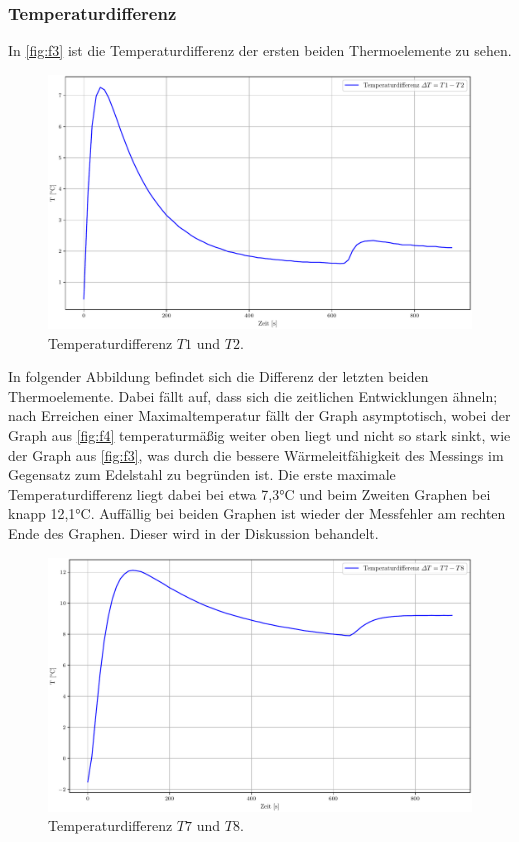 \subsubsection{Temperaturdifferenz}
In \autoref{fig:f3} ist die Temperaturdifferenz der ersten beiden Thermoelemente 
zu sehen.
\begin{figure}[H]
  \centering
  \includegraphics[width=\textwidth]{plotdiff12.pdf}
  \caption{Temperaturdifferenz $T1$ und $T2$.}
  \label{fig:f3}
\end{figure}
In folgender Abbildung befindet sich die Differenz der letzten beiden Thermoelemente.
Dabei fällt auf, dass sich die zeitlichen Entwicklungen ähneln; nach Erreichen 
einer Maximaltemperatur fällt der Graph asymptotisch, wobei der Graph aus 
\autoref{fig:f4} temperaturmäßig weiter oben liegt und nicht so stark sinkt, wie 
der Graph aus \autoref{fig:f3}, was durch die bessere Wärmeleitfähigkeit des Messings 
im Gegensatz zum Edelstahl zu begründen ist. Die erste maximale
Temperaturdifferenz liegt dabei bei etwa 7,3°C und beim Zweiten Graphen bei 
knapp 12,1°C. Auffällig bei beiden Graphen ist wieder der Messfehler am rechten
Ende des Graphen. Dieser wird in der Diskussion behandelt. 
\begin{figure}[H]
  \centering
  \includegraphics[width=\textwidth]{plotdiff78.pdf}
  \caption{Temperaturdifferenz $T7$ und $T8$.}
  \label{fig:f4}
\end{figure}

